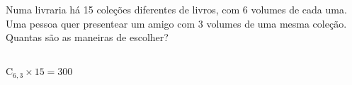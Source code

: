 \begin{ex}
 Numa livraria há 15 coleções diferentes de livros, com 6 volumes de cada uma. Uma pessoa quer presentear um amigo com 3 volumes de uma mesma coleção. Quantas são as maneiras de escolher?
  \begin{sol}
      \phantom{A} \\
  $\text{C}_{6,3}\times15=300$
  \end{sol}
\end{ex}